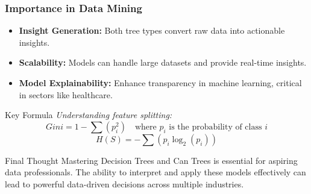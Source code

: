 \documentclass[aspectratio=169]{beamer}
\begin{document}
\begin{frame}[fragile]
    \frametitle{Importance in Data Mining}
    \begin{itemize}
        \item \textbf{Insight Generation:} Both tree types convert raw data into actionable insights.
        \item \textbf{Scalability:} Models can handle large datasets and provide real-time insights.
        \item \textbf{Model Explainability:} Enhance transparency in machine learning, critical in sectors like healthcare.
    \end{itemize}
    
    \begin{block}{Key Formula}
        \textit{Understanding feature splitting:}
        \begin{equation}
            Gini = 1 - \sum (p_i^2) \quad \text{where } p_i \text{ is the probability of class } i
        \end{equation}
        \begin{equation}
            H(S) = -\sum (p_i \log_2(p_i))
        \end{equation}
    \end{block}

    \begin{block}{Final Thought}
        Mastering Decision Trees and Can Trees is essential for aspiring data professionals. The ability to interpret and apply these models effectively can lead to powerful data-driven decisions across multiple industries.
    \end{block}
\end{frame}
\end{document}
